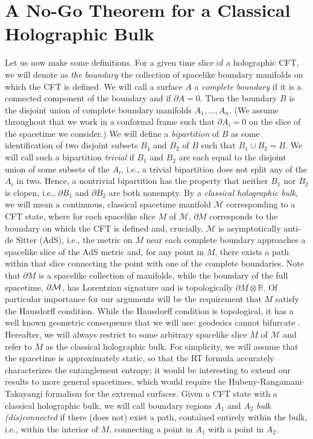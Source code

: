 \documentclass[12pt,english]{article}
\begin{document}
\section{A No-Go Theorem for a Classical Holographic Bulk}\label{sec:nogo}

Let us now make some definitions. For a given time slice of a holographic CFT, we will denote as {\it the boundary} the collection of spacelike boundary manifolds on which the CFT is defined. We will call a surface $A$ a {\it complete boundary} if it is a connected component of the boundary and if $\partial A = 0$. Then the boundary $B$ is the disjoint union of complete boundary manifolds $A_1,...,A_n$. (We assume throughout that we work in a conformal frame such that $\partial A_i = 0$ on the slice of the spacetime we consider.) We will define a {\it bipartition} of $B$ as some identification of two disjoint subsets $B_1$ and $B_2$ of $B$ such that $B_1 \cup B_2 = B$. We will call such a bipartition {\it trivial} if $B_1$ and $B_2$ are each equal to the disjoint union of some subsets of the $A_i$, i.e., a trivial bipartition does not split any of the $A_i$ in two. Hence, a nontrivial bipartition has the property that neither $B_1$ nor $B_2$ is clopen, i.e., $\partial B_1$ and $\partial B_2$ are both nonempty.
By a {\it classical holographic bulk}, we will mean a continuous, classical spacetime manifold $\mathcal{M}$ corresponding to a CFT state, where for each spacelike slice $M$ of $\mathcal{M}$, $\partial M$ corresponds to the boundary on which the CFT is defined and, crucially, $\mathcal{M}$ is asymptotically anti-de Sitter (AdS), i.e., the metric on $M$ near each complete boundary approaches a spacelike slice of the AdS metric and, for any point in $M$, there exists a path within that slice connecting the point with one of the complete boundaries. Note that $\partial M$ is a spacelike collection of manifolds, while the boundary of the full spacetime, $\partial{\cal M}$, has Lorentzian signature and is topologically $\partial M \otimes {\mathbb R}$. Of particular importance for our arguments will be the requirement that $M$ satisfy the Hausdorff condition. While the Hausdorff condition is topological, it has a well known geometric consequence that we will use: geodesics cannot bifurcate \cite{Hajicek}. Hereafter, we will always restrict to some arbitrary spacelike slice $M$ of $\mathcal{M}$ and refer to $M$ as the classical holographic bulk. For simplicity, we will assume that the spacetime is approximately static, so that the RT formula accurately characterizes the entanglement entropy; it would be interesting to extend our results to more general spacetimes, which would require the Hubeny-Rangamani-Takayangi \cite{Hubeny:2007xt} formalism for the extremal surfaces. Given a CFT state with a classical holographic bulk, we will call boundary regions $A_1$ and $A_2$ {\it bulk (dis)connected} if there (does not) exist a path, contained entirely within the bulk, i.e., within the interior of $M$, connecting a point in $A_1$ with a point in $A_2$.
\end{document}
